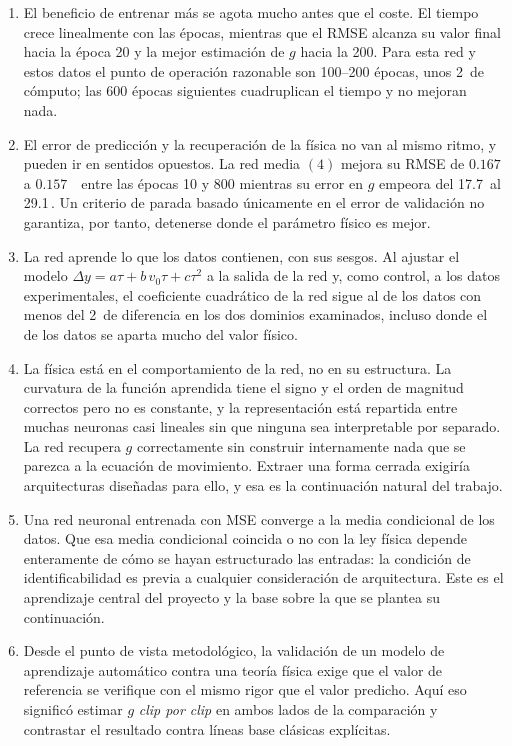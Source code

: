 \documentclass[titlepage,11pt]{article}
\providecommand{\num}[1]{\ensuremath{#1}}
\providecommand{\SI}[2]{#1\,#2}
\providecommand{\percent}{\char37\relax}
\begin{document}
\begin{enumerate}
\item El beneficio de entrenar más se agota mucho antes que el coste.
  El tiempo crece linealmente con las épocas, mientras que el RMSE alcanza su
  valor final hacia la época 20 y la mejor estimación de $g$ hacia la 200. Para
  esta red y estos datos el punto de operación razonable son 100--200 épocas,
  unos \SI{2}{\second} de cómputo; las 600 épocas siguientes cuadruplican el
  tiempo y no mejoran nada.

\item El error de predicción y la recuperación de la física no van al
  mismo ritmo, y pueden ir en sentidos opuestos. La red media $(4)$ mejora su
  RMSE de \num{0.167} a \num{0.157}~\meter\ entre las épocas 10 y 800 mientras
  su error en $g$ empeora del \SI{17.7}{\percent} al \SI{29.1}{\percent}. Un
  criterio de parada basado únicamente en el error de validación no garantiza,
  por tanto, detenerse donde el parámetro físico es mejor.

\item La red aprende lo que los datos contienen, con sus sesgos. Al
  ajustar el modelo $\Delta y = a\tau + b\,v_0\tau + c\tau^2$ a la salida de la
  red y, como control, a los datos experimentales, el coeficiente cuadrático de
  la red sigue al de los datos con menos del \SI{2}{\percent} de diferencia en
  los dos dominios examinados, incluso donde el de los datos se aparta mucho
  del valor físico.

\item La física está en el comportamiento de la red, no en su
  estructura. La curvatura de la función aprendida tiene el signo y el orden
  de magnitud correctos pero no es constante, y la representación está
  repartida entre muchas neuronas casi lineales sin que ninguna sea
  interpretable por separado. La red recupera $g$ correctamente sin construir
  internamente nada que se parezca a la ecuación de movimiento. Extraer una
  forma cerrada exigiría arquitecturas diseñadas para ello, y esa es la
  continuación natural del trabajo.

\item Una red neuronal entrenada con MSE converge a la media condicional de los
  datos. Que esa media condicional coincida o no con la ley física depende
  enteramente de cómo se hayan estructurado las entradas: la condición de
  identificabilidad es previa a cualquier consideración de arquitectura. Este
  es el aprendizaje central del proyecto y la base sobre la que se plantea su
  continuación.

\item Desde el punto de vista metodológico, la validación de un modelo de
  aprendizaje automático contra una teoría física exige que el valor de
  referencia se verifique con el mismo rigor que el valor predicho. Aquí eso
  significó estimar $g$ \emph{clip por clip} en ambos lados de la comparación y
  contrastar el resultado contra líneas base clásicas explícitas.
\end{enumerate}
\end{document}
